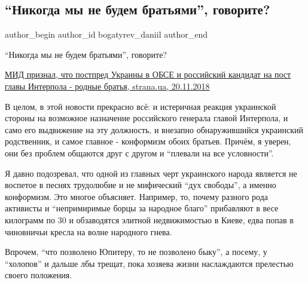  
 
 
 
 
 
\subsection{\enquote{Никогда мы не будем братьями}, говорите?}
\label{sec:20_11_2018.fb.bogatyrev_daniil.1.bratja_interpol}
 
\ifcmt
 author_begin
   author_id bogatyrev_daniil
 author_end
\fi

\enquote{Никогда мы не будем братьями}, говорите?

\href{https://strana.news/news/172260-v-mid-ukrainy-prokommentirovali-rodstvo-postpreda-v-obse-prokopchuka-s-rossijaninom-kotoryj-mozhet-vozhlavit-interpol.html}{%
МИД признал, что постпред Украины в ОБСЕ и российский кандидат на пост главы Интерпола - родные братья, %
strana.ua, 20.11.2018%
}

В целом, в этой новости прекрасно всё: и истеричная реакция украинской стороны
на возможное назначение российского генерала главой Интерпола, и само его
выдвижение на эту должность, и внезапно обнаружившийся украинский родственник,
и самое главное - конформизм обоих братьев. Причём, я уверен, они без проблем
общаются друг с другом и \enquote{плевали на все условности}.

Я давно подозревал, что одной из главных черт украинского народа является не
воспетое в песнях трудолюбие и не мифический \enquote{дух свободы}, а именно
конформизм. Это многое объясняет. Например, то, почему  разного рода активисты
и \enquote{непримиримые борцы за народное благо} прибавляют в весе килограмм по 30 и
обзаводятся элитной недвижимостью в Киеве, едва попав в чиновничьи кресла на
волне народного гнева.

Впрочем, \enquote{что позволено Юпитеру, то не позволено быку}, а посему, у \enquote{холопов} и
дальше лбы трещат, пока хозяева жизни наслаждаются прелестью своего положения.
